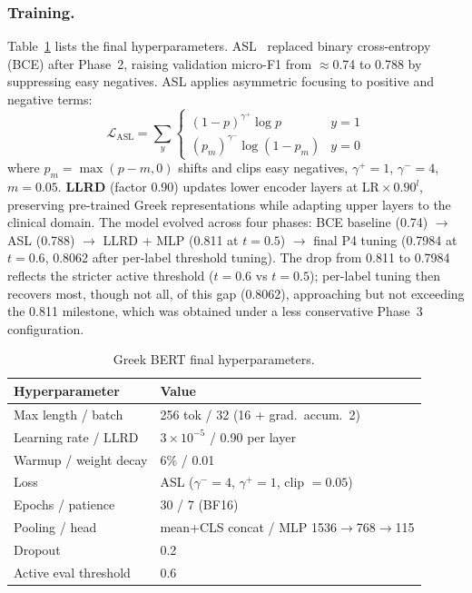 \subsubsection{Training.}
Table~\ref{tab:bert_params} lists the final hyperparameters. ASL~\cite{ridnik2021asl} replaced binary cross-entropy (BCE) after Phase~2, raising
validation micro-F1 from $\approx$0.74 to 0.788 by suppressing easy negatives.
ASL applies asymmetric focusing to positive and negative terms:
\begin{equation}
\mathcal{L}_{\text{ASL}} = \sum_y \begin{cases}
  (1-p)^{\gamma^+} \log p & y=1 \\
  (p_m)^{\gamma^-} \log(1-p_m) & y=0
\end{cases}
\end{equation}
where $p_m = \max(p - m, 0)$ shifts and clips easy negatives, $\gamma^+=1$, $\gamma^-=4$, $m=0.05$.
\textbf{LLRD} (factor 0.90) updates lower encoder layers at $\text{LR}\times0.90^l$,
preserving pre-trained Greek representations while adapting upper layers to the clinical
domain. The model evolved across four phases:
BCE baseline (0.74) $\to$ ASL (0.788) $\to$ LLRD + MLP (0.811 at $t{=}0.5$) $\to$ final P4 tuning
(0.7984 at $t{=}0.6$, 0.8062 after per-label threshold tuning).
The drop from 0.811 to 0.7984 reflects the stricter active threshold ($t{=}0.6$ vs $t{=}0.5$); per-label tuning then recovers most, though not all, of this gap (0.8062), approaching but not exceeding the 0.811 milestone, which was obtained under a less conservative Phase~3 configuration.

\begin{table}[h]
\centering
\caption{Greek BERT final hyperparameters.}
\label{tab:bert_params}
\begin{tabular}{ll}
\toprule
Hyperparameter & Value \\
\midrule
Max length / batch & 256 tok / 32 (16 + grad.\ accum.\ 2) \\
Learning rate / LLRD & $3\times10^{-5}$ / 0.90 per layer \\
Warmup / weight decay & 6\% / 0.01 \\
Loss & ASL ($\gamma^-=4$, $\gamma^+=1$, clip $=0.05$) \\
Epochs / patience & 30 / 7 (BF16) \\
Pooling / head & mean+CLS concat / MLP 1536$\to$768$\to$115 \\
Dropout & 0.2 \\
Active eval threshold & 0.6 \\
\bottomrule
\end{tabular}
\end{table}

